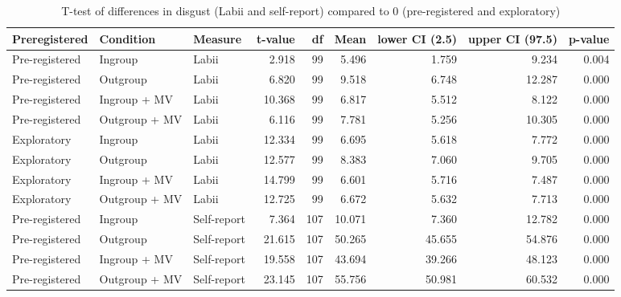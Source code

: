 \begin{table}[ht]
\centering
\caption{T-test of differences in disgust (Labii and self-report) compared to 0 (pre-registered and exploratory)} 
\label{tab:prereg_ttest}
\begingroup\fontsize{8pt}{10pt}\selectfont
\begin{tabular}{lllrrrrrr}
  \hline
Preregistered & Condition & Measure & t-value & df & Mean & lower CI (2.5) & upper CI (97.5) & p-value \\ 
  \hline
Pre-registered & Ingroup & Labii & 2.918 & 99 & 5.496 & 1.759 & 9.234 & 0.004 \\ 
  Pre-registered & Outgroup & Labii & 6.820 & 99 & 9.518 & 6.748 & 12.287 & 0.000 \\ 
  Pre-registered & Ingroup + MV & Labii & 10.368 & 99 & 6.817 & 5.512 & 8.122 & 0.000 \\ 
  Pre-registered & Outgroup + MV & Labii & 6.116 & 99 & 7.781 & 5.256 & 10.305 & 0.000 \\ 
  Exploratory & Ingroup & Labii & 12.334 & 99 & 6.695 & 5.618 & 7.772 & 0.000 \\ 
  Exploratory & Outgroup & Labii & 12.577 & 99 & 8.383 & 7.060 & 9.705 & 0.000 \\ 
  Exploratory & Ingroup + MV & Labii & 14.799 & 99 & 6.601 & 5.716 & 7.487 & 0.000 \\ 
  Exploratory & Outgroup + MV & Labii & 12.725 & 99 & 6.672 & 5.632 & 7.713 & 0.000 \\ 
  Pre-registered & Ingroup & Self-report & 7.364 & 107 & 10.071 & 7.360 & 12.782 & 0.000 \\ 
  Pre-registered & Outgroup & Self-report & 21.615 & 107 & 50.265 & 45.655 & 54.876 & 0.000 \\ 
  Pre-registered & Ingroup + MV & Self-report & 19.558 & 107 & 43.694 & 39.266 & 48.123 & 0.000 \\ 
  Pre-registered & Outgroup + MV & Self-report & 23.145 & 107 & 55.756 & 50.981 & 60.532 & 0.000 \\ 
   \hline
\end{tabular}
\endgroup
\end{table}
